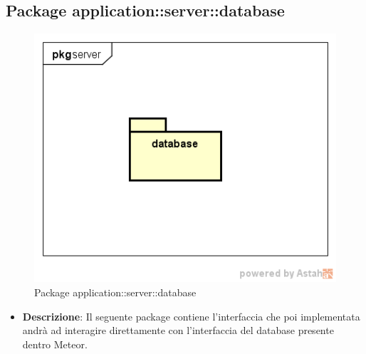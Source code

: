 \subsection{Package application::server::database}
\label{Package application::server::database}
\begin{figure}[H]
	\centering
	\includegraphics[scale=0.6]{Sezioni/Packages/App/pck_server.png}
	\caption{Package application::server::database}
\end{figure}

\begin{itemize}
\item \textbf{Descrizione}: Il seguente package contiene l'interfaccia che poi implementata andrà ad interagire direttamente con l'interfaccia del database presente dentro Meteor.
\end{itemize}


















